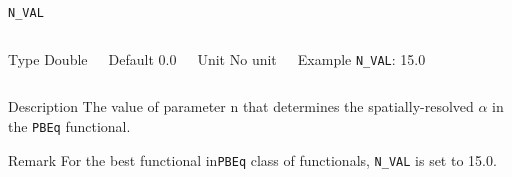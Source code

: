 	
	\begin{frame}[allowframebreaks]{\texttt{N\_VAL}} \label{N_VAL}
		\vspace*{-12pt}
		\begin{columns}
		\begin{block}{Type}
		Double
		\end{block}
		
		\begin{block}{Default}
		 0.0
		\end{block}
		
		\begin{block}{Unit}
		No unit
		\end{block}
		
		\begin{block}{Example}
		\texttt{N\_VAL}: 15.0
		\end{block}
		\end{columns}
		
		\begin{block}{Description}
		 The value of parameter n that determines the spatially-resolved $\alpha$ in the \texttt{PBEq} functional.
		\end{block}
		
		\begin{block}{Remark}
		For the best functional in\texttt{PBEq} class of functionals, \texttt{N\_VAL} is set to 15.0.
		\end{block}
		\end{frame}
	
